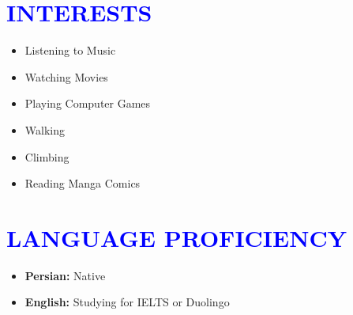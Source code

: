 \documentclass[letterpaper,11pt]{article}
\newcommand{\resumeSubHeadingListStart}{\begin{itemize}[leftmargin=0.0in, label={}]}
\newcommand{\resumeSubHeadingListEnd}{\end{itemize}}
\begin{document}
	\section{\Large{\textcolor{blue}{INTERESTS}}}
	\begin{multicols}{4}
		\begin{itemize}[itemsep=-2pt, parsep=5pt]
			\item Listening to Music
			\item Watching Movies
			\item Playing Computer Games
			\item Walking
			\item Climbing
			\item Reading Manga Comics
		\end{itemize}
		
	\end{multicols}
	
	\section{\Large{\textcolor{blue}{LANGUAGE PROFICIENCY}}}
	\begin{itemize}[itemsep=-2pt, parsep=5pt]
		\item \textbf{Persian:} Native
		\item \textbf{English:} Studying for IELTS or Duolingo
	\end{itemize}
	
\end{document}
